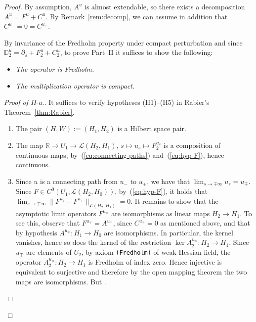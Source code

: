 \documentclass[pdftex]{sigma}
\numberwithin{equation}{section}
\newcommand{\D}{{\mathbb{D}}}
\newcommand{\F}{{\mathbb{F}}}
\newcommand{\R}{{\mathbb{R}}}
\newcommand{\Ll}{{\mathcal{L}}} %
\newcommand{\norm}{{\rm norm}}
\def\norm#1{\mathopen\|#1\mathclose\|}
\newcommand{\p}{{\partial}}
\newcommand{\1}{{{\mathchoice {\rm 1\mskip-4mu l} {\rm 1\mskip-4mu l}
{\rm 1\mskip-4.5mu l} {\rm 1\mskip-5mu l}}}}
\begin{document}
\begin{proof}
By assumption, $A^u$ is almost extendable,
so there exists a decomposition $A^u=F^u+C^u$.
By Remark~\ref{rem:decomp}, we can assume in addition
that $C^{u_-}=0=C^{u_+}$.

By invariance of the Fredholm property under compact perturbation
and since $\D^u_2=\p_s +F^u_2+C^u_2$, to prove Part~II it suffices to
show the following:
\begin{itemize}\setlength{\leftskip}{0.10cm}\itemsep=0pt
\item[\bf II-a.]
 \textit{The operator
 \smash{$\F^u_2=\p_s+F^u_2\colon W^{1,2}_{H_1}\cap L^2_{H_2}\to L^2_{H_1}$}
 is Fredholm.}
\item[\bf II-b.]
 \textit{The multiplication operator
 is compact.}
\end{itemize}

\begin{proof}[Proof of II-a.]
It suffices to verify hypotheses (H1)--(H5)
in Rabier's Theorem~\ref{thm:Rabier}.
\begin{enumerate}\itemsep=0pt
\item[(H1)] The pair $(H,W):=(H_1,H_2)$ is a Hilbert space pair.

\item[(H2)] The map
$\R\to U_1 \to \Ll(H_2,H_1)$, $s\mapsto u_s\mapsto F^{u_s}_2$
is a composition of continuous maps, by~(\ref{eq:connecting-paths})
and~(\ref{eq:hyp-F}), hence continuous.

\item[(H3)]
Since $u$ is a connecting path from $u_-$ to $u_+$, we have
that $\lim_{s\to\mp\infty} u_s=u_\mp$.
Since $F\in C^0(U_1,\Ll(H_2,H_0))$, by~(\ref{eq:hyp-F}),
it holds that
$\lim_{s\to\mp\infty}\norm{F^{u_s}-F^{u_\mp}}_{\Ll(H_2,H_1)}
 =0$.
It remains to show that the asymptotic
limit operators $F^{u_\mp}$ are isomorphisms as linear maps $H_2\to H_1$.
To see this, observe that $F^{u_\mp}=A^{u_\mp}$, since $C^{u_\mp}=0$ as
mentioned above, and that by hypothesis $A^{u_\mp}\colon H_1\to H_0$
are isomorphisms.
In particular, the kernel vanishes, hence so does the kernel of the
restriction $\ker A^{u_\mp}_2\colon H_2\to H_1$.
Since $u_\mp$ are elements of $U_2$, by axiom \texttt{(Fredholm)}
of weak Hessian field, the operator $A^{u_\mp}_2\colon H_2\to H_1$ is
Fredholm of index zero.
Hence injective is equivalent to surjective
and therefore by the open mapping theorem the two maps
 are isomorphisms. But .


\end{enumerate}
\end{proof}
\end{proof}
\end{document}
